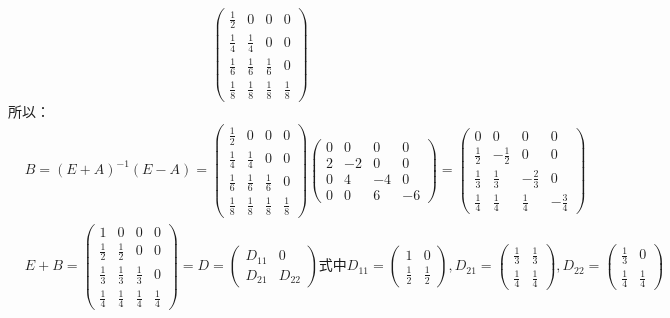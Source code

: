 \documentclass[a4paper]{report}
\begin{document}
\begin{jie}
\begin{equation*}
\begin{pmatrix}
\frac{1}{2}&0&0&0\\
\frac{1}{4}&\frac{1}{4}&0&0\\
\frac{1}{6}&\frac{1}{6}&\frac{1}{6}&0\\
\frac{1}{8}&\frac{1}{8}&\frac{1}{8}&\frac{1}{8}
\end{pmatrix}
\end{equation*}
所以：
\begin{align*}
&B=(E+A)^{-1}(E-A)=
\begin{pmatrix}
\frac{1}{2}&0&0&0\\
\frac{1}{4}&\frac{1}{4}&0&0\\
\frac{1}{6}&\frac{1}{6}&\frac{1}{6}&0\\
\frac{1}{8}&\frac{1}{8}&\frac{1}{8}&\frac{1}{8}
\end{pmatrix}\begin{pmatrix}
0&0&0&0\\
2&-2&0&0\\
0&4&-4&0\\
0&0&6&-6
\end{pmatrix}=\begin{pmatrix}
0&0&0&0\\
\frac{1}{2}&-\frac{1}{2}&0&0\\
\frac{1}{3}&\frac{1}{3}&-\frac{2}{3}&0\\
\frac{1}{4}&\frac{1}{4}&\frac{1}{4}&-\frac{3}{4}
\end{pmatrix}\\ &
E+B=\begin{pmatrix}
1&0&0&0\\
\frac{1}{2}&\frac{1}{2}&0&0\\
\frac{1}{3}&\frac{1}{3}&\frac{1}{3}&0\\
\frac{1}{4}&\frac{1}{4}&\frac{1}{4}&\frac{1}{4}
\end{pmatrix}=D=
\begin{pmatrix}
D_{11}&0\\
D_{21}&D_{22}
\end{pmatrix}\text{式中}
D_{11}=
\begin{pmatrix}
1&0\\
\frac{1}{2}&\frac{1}{2}
\end{pmatrix},D_{21}=
\begin{pmatrix}
\frac{1}{3}&\frac{1}{3}\\
\frac{1}{4}&\frac{1}{4}
\end{pmatrix},D_{22}=
\begin{pmatrix}
\frac{1}{3}&0\\
\frac{1}{4}&\frac{1}{4}
\end{pmatrix}

\end{align*}
\end{jie}
\end{document}
